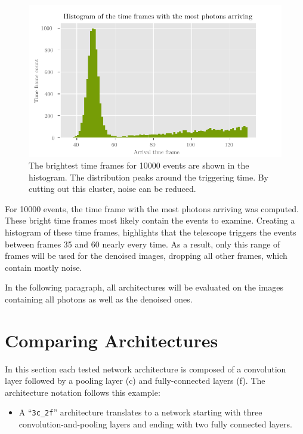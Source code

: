 \begin{figure}
    \centering
    \includegraphics[scale=1]{Plots/Arrivaltimes.pdf}
    \caption{The brightest time frames for \num{10000} events are shown in the histogram. The distribution peaks around the triggering time. By cutting out this cluster, noise can be reduced.}
    \label{fig:arrivaltimes}
\end{figure}

For \num{10000} events, the time frame with the most photons arriving was computed.
These bright time frames most likely contain the events to examine.
Creating a histogram of these time frames,
highlights that the telescope triggers the events between frames \num{35} and \num{60} nearly every time.
As a result, only this range of frames will be used for the denoised images,
dropping all other frames, which contain mostly noise.

In the following paragraph, all architectures will be evaluated on the images
containing all photons as well as the denoised ones.


\section{Comparing Architectures}
In this section each tested network architecture is composed of a convolution layer followed by a pooling layer (c)
and fully-connected layers (f).
The architecture notation follows this example:

\begin{itemize}
\item A \enquote{\texttt{3c\_2f}} architecture translates to a network
starting with three convolution-and-pooling layers and ending with two fully connected layers.
\end{itemize}

